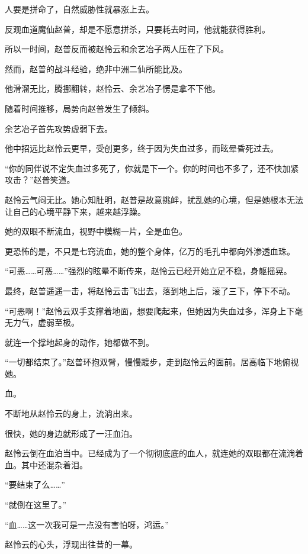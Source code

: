
\begin{this_body}

人要是拼命了，自然威胁性就暴涨上去。

反观血道魔仙赵普，却是不愿意拼杀，只要耗去时间，他就能获得胜利。

所以一时间，赵普反而被赵怜云和余艺冶子两人压在了下风。

然而，赵普的战斗经验，绝非中洲二仙所能比及。

他滑溜无比，腾挪翻转，赵怜云、余艺冶子愣是拿不下他。

随着时间推移，局势向赵普发生了倾斜。

余艺冶子首先攻势虚弱下去。

他中招远比赵怜云更早，受创更多，终于因为失血过多，而眩晕昏死过去。

“你的同伴说不定失血过多死了，你就是下一个。你的时间也不多了，还不快加紧攻击？”赵普笑道。

赵怜云气闷无比。她心知肚明，赵普是故意挑衅，扰乱她的心境，但是她根本无法让自己的心境平静下来，越来越浮躁。

她的双眼不断流血，视野中模糊一片，全是血色。

更恐怖的是，不只是七窍流血，她的整个身体，亿万的毛孔中都向外渗透血珠。

“可恶……可恶……”强烈的眩晕不断传来，赵怜云已经开始立足不稳，身躯摇晃。

最终，赵普遥遥一击，将赵怜云击飞出去，落到地上后，滚了三下，停下不动。

“可恶啊！”赵怜云双手支撑着地面，想要爬起来，但她因为失血过多，浑身上下毫无力气，虚弱至极。

就连一个撑地起身的动作，她都做不到。

“一切都结束了。”赵普环抱双臂，慢慢踱步，走到赵怜云的面前。居高临下地俯视她。

血。

不断地从赵怜云的身上，流淌出来。

很快，她的身边就形成了一汪血泊。

赵怜云倒在血泊当中。已经成为了一个彻彻底底的血人，就连她的双眼都在流淌着血。其中还混杂着泪。

“要结束了么……”

“就倒在这里了。”

“血……这一次我可是一点没有害怕呀，鸿运。”

赵怜云的心头，浮现出往昔的一幕。


\end{this_body}
